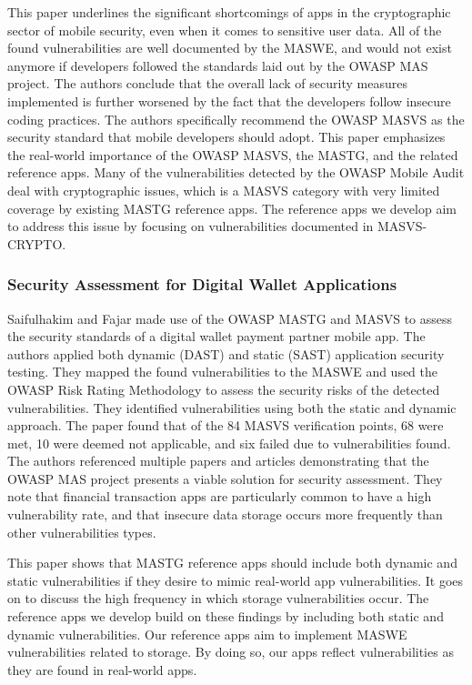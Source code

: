 This paper underlines the significant shortcomings of apps in the cryptographic sector of mobile security, even when it comes to sensitive user data. All of the found vulnerabilities are well documented by the MASWE, and would not exist anymore if developers followed the standards laid out by the OWASP MAS project. The authors conclude that the overall lack of security measures implemented is further worsened by the fact that the developers follow insecure coding practices. The authors specifically recommend the OWASP MASVS as the security standard that mobile developers should adopt. This paper emphasizes the real-world importance of the OWASP MASVS, the MASTG, and the related reference apps. Many of the vulnerabilities detected by the OWASP Mobile Audit deal with cryptographic issues, which is a MASVS category with very limited coverage by existing MASTG reference apps. The reference apps we develop aim to address this issue by focusing on vulnerabilities documented in MASVS-CRYPTO.

\subsubsection{Security Assessment for Digital Wallet Applications}
Saifulhakim and Fajar \citep{paper_02} made use of the OWASP MASTG and MASVS to assess the security standards of a digital wallet payment partner mobile app. The authors applied both dynamic (DAST) and static (SAST) application security testing. They mapped the found vulnerabilities to the MASWE and used the OWASP Risk Rating Methodology to assess the security risks of the detected vulnerabilities. They identified vulnerabilities using both the static and dynamic approach.  The paper found that of the 84 MASVS verification points, 68 were met, 10 were deemed not applicable, and six failed due to vulnerabilities found. The authors referenced multiple papers and articles demonstrating that the OWASP MAS project presents a viable solution for security assessment. They note that financial transaction apps are particularly common to have a high vulnerability rate, and that insecure data storage occurs more frequently than other vulnerabilities types. 

This paper shows that MASTG reference apps should include both dynamic and static vulnerabilities if they desire to mimic real-world app vulnerabilities. It goes on to discuss the high frequency in which storage vulnerabilities occur. The reference apps we develop build on these findings by including both static and dynamic vulnerabilities. Our reference apps aim to implement MASWE vulnerabilities related to storage. By doing so, our apps reflect vulnerabilities as they are found in real-world apps.

